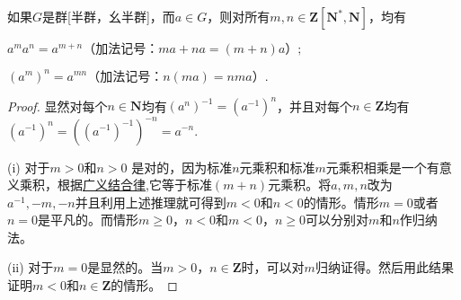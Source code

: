 \documentclass[../../main.tex]{subfiles}
\begin{document}
\begin{theorem}
如果$G$是群[半群，幺半群]，而$a \in G$，则对所有$m, n \in \boldsymbol{Z}[\boldsymbol{N}^*, \boldsymbol{N}]$，均有

 $ a^m a^n = a^{m + n} \text{（加法记号：} ma + na = (m + n)a\text{）}; $

 $ (a^m)^n = a^{mn} \text{（加法记号：} n(ma) = nma\text{）}.$
\end{theorem}
\begin{proof}
显然对每个$n \in \boldsymbol{N}$均有$(a^n)^{-1} = (a^{-1})^n$，并且对每个$n \in \boldsymbol{Z}$均有$(a^{-1})^n=((a^{-1})^{-1})^{-n}=a^{-n}$.

(i) 对于$m > 0$和$n > 0$ 是对的，因为标准$n$元乘积和标准$m$元乘积相乘是一个有意义乘积，根据\hyperref[theorem:广义结合律]{广义结合律},它等于标准$(m + n)$元乘积。将$a, m, n$改为$a^{-1}, -m, -n$并且利用上述推理就可得到$m < 0$和$n < 0$的情形。情形$m = 0$或者$n = 0$是平凡的。而情形$m \geqslant 0$，$n < 0$和$m < 0$，$n \geqslant 0$可以分别对$m$和$n$作归纳法。

(ii) 对于$m = 0$是显然的。当$m > 0$，$n \in \boldsymbol{Z}$时，可以对$m$归纳证得。然后用此结果证明$m < 0$和$n \in \boldsymbol{Z}$的情形。

\end{proof}
\end{document}
